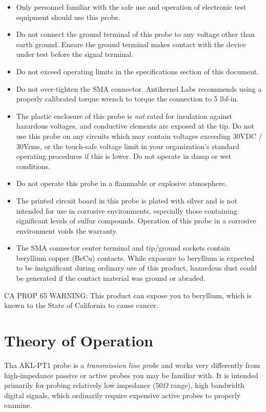 \documentclass[11pt]{article}
\begin{document}
\begin{itemize}
\item Only personnel familiar with the safe use and operation of electronic test equipment should use this probe.
\item Do not connect the ground terminal of this probe to any voltage other than earth ground. Ensure the ground terminal
makes contact with the device under test before the signal terminal.
\item Do not exceed operating limits in the specifications section of this document.
\item Do not over-tighten the SMA connector. Antikernel Labs recommends using a properly calibrated torque wrench to
torque the connection to 5 lbf-in.
\item The plastic enclosure of this probe is \emph{not} rated for insulation against hazardous voltages, and conductive
elements are exposed at the tip. Do not use this probe on any circuits which may contain voltages exceeding 30VDC /
30Vrms, or the touch-safe voltage limit in your organization's standard operating procedures if this is lower. Do not
operate in damp or wet conditions.
\item Do not operate this probe in a flammable or explosive atmosphere.
\item The printed circuit board in this probe is plated with silver and is not intended for use in corrosive environments,
especially those containing significant levels of sulfur compounds. Operation of this probe in a corrosive environment
voids the warranty.
\item  The SMA connector center terminal and tip/ground sockets contain beryllium copper (BeCu) contacts. While exposure to
beryllium is expected to be insignificant during ordinary use of this product, hazardous dust could be generated if the
contact material was ground or abraded.
\end{itemize}

CA PROP 65 WARNING: This product can expose you to beryllium, which is known to the State of California to cause cancer.

\pagebreak
\section{Theory of Operation}

Tha AKL-PT1 probe is a \emph{transmission line probe} and works very differently from high-impedance passive or active
probes you may be familiar with. It is intended primarily for probing relatively low impedance ($50 \Omega$ range),
high bandwidth digital signals, which ordinarily require expensive active probes to properly examine.
\end{document}
